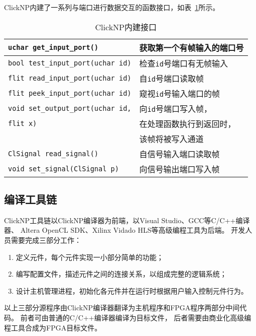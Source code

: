 ClickNP内建了一系列与端口进行数据交互的函数接口，如表~\ref{tab:operations}所示。
\begin{table}[htbp]
\centering
\caption{ClickNP内建接口} \label{tab:operations}
\begin{tabular}{l|l}
\hline
\lstinline$uchar get_input_port()$         & 获取第一个有帧输入的端口号 \\
\hline
\lstinline$bool test_input_port(uchar id)$ & 检查\lstinline$id$号端口有无帧输入 \\
\hline
\lstinline$flit read_input_port(uchar id)$ & 自\lstinline$id$号端口读取帧 \\
\hline
\lstinline$flit peek_input_port(uchar id)$ & 窥视\lstinline$id$号输入端口的帧 \\
\hline
\lstinline$void set_output_port(uchar id,$ & 向\lstinline$id$号端口写入帧， \\
\lstinline$flit x)$                        & 在处理函数执行到返回时， \\
                                           & 该帧将被写入通道 \\
\hline
\lstinline$ClSignal read_signal()$         & 自信号输入端口读取帧 \\
\hline
\lstinline$void set_signal(ClSignal p)$    & 向信号输出端口写入帧 \\
\hline
\end{tabular}
\end{table}

\subsection{编译工具链}
ClickNP工具链以ClickNP编译器为前端，以Visual Studio、GCC等C/C++编译器、
Altera OpenCL SDK、Xilinx Vidado HLS等高级编程工具为后端。
开发人员需要完成三部分工作：
\begin{enumerate}
\item 定义元件，每个元件实现一小部分简单的功能；
\item 编写配置文件，描述元件之间的连接关系，以组成完整的逻辑系统；
\item 设计主机管理进程，初始化各元件并在运行时根据用户输入控制元件行为。
\end{enumerate}

以上三部分源程序由ClickNP编译器翻译为主机程序和FPGA程序两部分中间代码。
前者可由普通的C/C++编译器编译为目标文件，
后者需要由商业化高级编程工具合成为FPGA目标文件。
